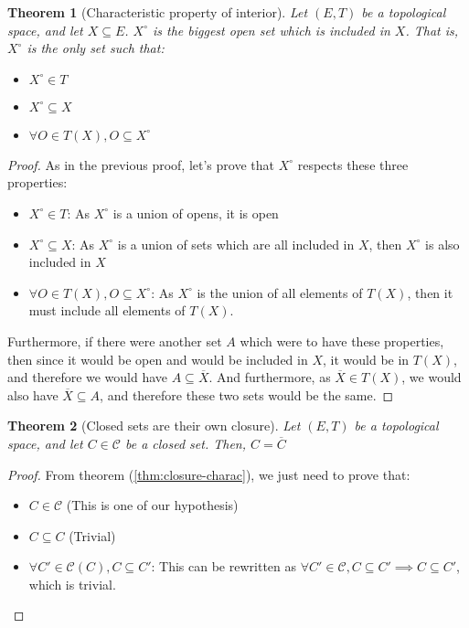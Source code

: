 \documentclass{article}
\newtheorem{theorem}{Theorem}[section]
\theoremstyle{definition}
\theoremstyle{remark}
\theoremstyle{example}
\theoremstyle{notation}
\newcommand{\inter}[1]{{{#1}^\circ}}
\newcommand{\closed}{\mathcal{C}}
\begin{document}
\begin{theorem}[Characteristic property of interior] \label{interior-charac}
		Let $(E, T)$ be a topological space, and let $X \subseteq E$. $\inter{X}$ is the biggest open set which is included in $X$. That is, $\inter{X}$ is the only set such that:
		\begin{itemize}
				\item $\inter{X} \in T$
				\item $\inter{X} \subseteq X$
				\item $\forall O \in T(X), O \subseteq \inter{X}$
		\end{itemize}
\end{theorem}

\begin{proof}
		As in the previous proof, let's prove that $\inter{X}$ respects these three properties:
		\begin{itemize}
				\item $\inter{X} \in T$: As $\inter{X}$ is a union of opens, it is open
				\item $\inter{X} \subseteq X$: As $\inter{X}$ is a union of sets which are all included in $X$, then $\inter{X}$ is also included in $X$
				\item $\forall O \in T(X), O \subseteq \inter{X}$: As $\inter{X}$ is the union of all elements of $T(X)$, then it must include all elements of $T(X)$.
		\end{itemize}
		Furthermore, if there were another set $A$ which were to have these properties, then since it would be open and would be included in $X$, it would be in $T(X)$, and therefore we would have $A \subseteq \overline{X}$. And furthermore, as $\overline{X} \in T(X)$, we would also have $\overline{X} \subseteq A$, and therefore these two sets would be the same.
\end{proof}

\begin{theorem}[Closed sets are their own closure] \label{thm:closed-eq-closure}
		Let $(E, T)$ be a topological space, and let $C \in \closed$ be a closed set. Then, $C = \overline{C}$
\end{theorem}

\begin{proof}
		From theorem (\ref{thm:closure-charac}), we just need to prove that:
		\begin{itemize}
				\item $C \in \closed$ (This is one of our hypothesis)
				\item $C \subseteq C$ (Trivial)
				\item $\forall C' \in \closed(C), C \subseteq C'$: This can be rewritten as $\forall C' \in \closed, C \subseteq C' \implies C \subseteq C'$, which is trivial.
		\end{itemize}
\end{proof}
\end{document}
